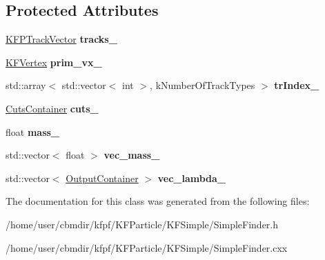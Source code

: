 \subsection*{Protected Attributes}
\begin{DoxyCompactItemize}
\item 
\hyperlink{classKFPTrackVector}{K\+F\+P\+Track\+Vector} {\bfseries tracks\+\_\+}\hypertarget{classSimpleFinder_a224eaba7c5a7830b730d15ae29e44088}{}\label{classSimpleFinder_a224eaba7c5a7830b730d15ae29e44088}

\item 
\hyperlink{classKFVertex}{K\+F\+Vertex} {\bfseries prim\+\_\+vx\+\_\+}\hypertarget{classSimpleFinder_aac6ae91fb844a0f67ffc31fe4ad09993}{}\label{classSimpleFinder_aac6ae91fb844a0f67ffc31fe4ad09993}

\item 
std\+::array$<$ std\+::vector$<$ int $>$, k\+Number\+Of\+Track\+Types $>$ {\bfseries tr\+Index\+\_\+}\hypertarget{classSimpleFinder_a290194488ca3d915194d9e5cc7169863}{}\label{classSimpleFinder_a290194488ca3d915194d9e5cc7169863}

\item 
\hyperlink{classCutsContainer}{Cuts\+Container} {\bfseries cuts\+\_\+}\hypertarget{classSimpleFinder_a7c2a911d99f8e634e47a68593d57291c}{}\label{classSimpleFinder_a7c2a911d99f8e634e47a68593d57291c}

\item 
float {\bfseries mass\+\_\+}\hypertarget{classSimpleFinder_aaa7bb0079c554838652b89905f1f0684}{}\label{classSimpleFinder_aaa7bb0079c554838652b89905f1f0684}

\item 
std\+::vector$<$ float $>$ {\bfseries vec\+\_\+mass\+\_\+}\hypertarget{classSimpleFinder_a1a259ed53902aefa2616e122114f7ef0}{}\label{classSimpleFinder_a1a259ed53902aefa2616e122114f7ef0}

\item 
std\+::vector$<$ \hyperlink{classOutputContainer}{Output\+Container} $>$ {\bfseries vec\+\_\+lambda\+\_\+}\hypertarget{classSimpleFinder_a80c1c67985d99f3ff0f68b9773fb7aa9}{}\label{classSimpleFinder_a80c1c67985d99f3ff0f68b9773fb7aa9}

\end{DoxyCompactItemize}


The documentation for this class was generated from the following files\+:\begin{DoxyCompactItemize}
\item 
/home/user/cbmdir/kfpf/\+K\+F\+Particle/\+K\+F\+Simple/Simple\+Finder.\+h\item 
/home/user/cbmdir/kfpf/\+K\+F\+Particle/\+K\+F\+Simple/Simple\+Finder.\+cxx\end{DoxyCompactItemize}
